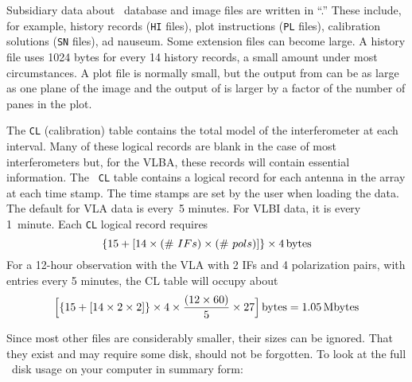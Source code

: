 
     Subsidiary data about \uv\ database and image files are written
in ``.''  These include, for example, history
records ({\tt HI} files), plot instructions ({\tt PL} files),
calibration solutions ({\tt SN} files), ad nauseum.  Some extension
files can become large.  A history file uses 1024 bytes for every 14
history records, a small amount under most circumstances.  A plot file
is normally small, but the output from {\tt {}} can be as
large as one plane of the image and the output of {\tt {}}
is larger by a factor of the number of panes in the plot.

     The {\tt CL} (calibration) table contains the total model of the
interferometer at each interval.  Many of these
logical records are blank in the case of most interferometers but, for
the VLBA, these records will contain essential information.  The {\tt
CL} table contains a logical record for each antenna in the array at
each  time stamp. The  time stamps are set by the
user when loading the data.  The default for VLA data is every~5
minutes.  For VLBI data, it is every 1~minute.  Each {\tt CL} logical
record requires
$$
  \lbrace 15 + \lbrack 14 \times  (\#~IFs) \times
       (\#~pols)\rbrack\rbrace \times 4 \rm\, bytes
$$
For a 12-hour observation with the VLA with 2 IFs and 4 polarization
pairs, with entries every 5 minutes, the CL table will occupy about
$$
   \Bigl\lbrack\lbrace 15 + \lbrack 14 \times 2 \times 2 \rbrack\rbrace
   \times 4 \times {(12 \times 60) \over 5 } \times 27 \Bigr\rbrack
   \rm\, bytes
   = 1.05 \rm\, Mbytes
$$

     Since most other files are considerably smaller, their sizes can
be ignored.  That they exist and may require some disk, should not be
forgotten.  To look at the full \AIPS\ disk usage on your computer in
summary form:
\pd


